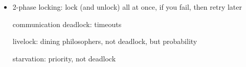 \documentclass[11pt]{article}
\begin{document}
\begin{itemize}
\begin{itemize}
                waste of resources: holding printer wil typing

            \item no preemption: virtualize, printer daemon
            \item circular wait: numerically ordered resources, no cycle

                problem: programmers won't acquire in order
        \end{itemize}

    \item 2-phase locking: lock (and unlock) all at once, if you fail, then retry later

        communication deadlock: timeouts

        livelock: dining philosophers, not deadlock, but probability

        starvation: priority, not deadlock
\end{itemize}
\end{document}
